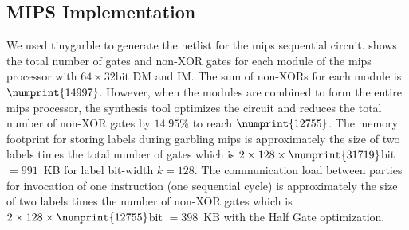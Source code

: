 \subsection{MIPS Implementation}
We used \gls{tinygarble} to generate the \gls{netlist} for the \gls{mips} sequential circuit.
 shows the total number of gates and non-XOR gates for each module of the \gls{mips} processor with $64\times32$bit DM and IM.
The sum of non-XORs for each module is $\numprint{14997}$.
However, when the modules are combined to form the entire \gls{mips} processor, the synthesis tool optimizes the circuit and reduces the total number of non-XOR gates by $14.95\%$ to reach $\numprint{12755}$.
The memory footprint for storing labels during garbling \gls{mips} is approximately the size of two labels times the total number of gates which is $2 \times 128 \times \numprint{31719}$bit $=991$~KB for label bit-width $k=128$.
The communication load between parties for invocation of one instruction (one sequential cycle) is approximately the size of two labels times the number of non-XOR gates which is $2\times 128 \times \numprint{12755}$bit $=398$~KB with the Half Gate optimization.


